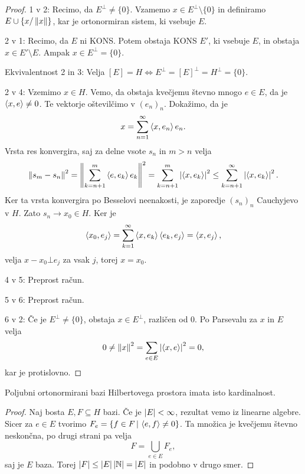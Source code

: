 \begin{proof}
  1 v 2:
  Recimo, da $E^\bot \ne \{0\}$.
  Vzamemo $x \in E^\bot \setminus \{0\}$ in definiramo $E \cup \{x /
  \left\lVert x\right\rVert\}$, kar je ortonormiran sistem, ki vsebuje $E$.
  \protislovje{}

  2 v 1:
  Recimo, da $E$ ni KONS\@.
  Potem obstaja KONS $E'$, ki vsebuje $E$, in obstaja $x \in E' \setminus E$.
  Ampak $x \in E^\bot = \{0\}$.
  \protislovje{}

  Ekvivalentnost 2 in 3:
  Velja $[E] = H \iff E^\bot = [E]^\bot = H^\bot = \{0\}$.

  2 v 4:
  Vzemimo $x \in H$.
  Vemo, da obstaja kvečjemu števno mnogo $e \in E$, da je $\left< x,e \right> \ne 0$.
  Te vektorje oštevilčimo v $(e_n)_n$.
  Dokažimo, da je
  \[
	x = \sum_{n=1}^\infty \left< x, e_n \right> e_n.
  \]
  Vrsta res konvergira, saj za delne vsote $s_n$ in $m > n$ velja
  \[
	\left\lVert s_m - s_n\right\rVert^2 = \left\lVert\sum_{k=n+1}^m \left< e, e_k \right> e_k\right\rVert^2
	= \sum_{k=n+1}^m \left| \left< x, e_k \right> \right|^2
	\le \sum_{k=n+1}^\infty \left| \left< x, e_k \right> \right|^2.
  \]
  Ker ta vrsta konvergira po Besselovi neenakosti, je zaporedje $(s_n)_n$
  Cauchyjevo v $H$.
  Zato $s_n \to x_0 \in H$.
  Ker je
  \[
	\left< x_0, e_j \right> = \sum_{k=1}^\infty \left< x, e_k \right> \left< e_k, e_j \right> = \left< x, e_j \right>,
  \]
  velja $x - x_0 \bot e_j$ za vsak $j$, torej $x = x_0$.

  4 v 5:
  Preprost račun.

  5 v 6:
  Preprost račun.

  6 v 2:
  Če je $E^\bot \ne \{0\}$, obstaja $x \in E^\bot$, različen od $0$.
  Po Parsevalu za $x$ in $E$ velja
  \[
	0 \ne \left\lVert x\right\rVert^2 = \sum_{e \in E} \left| \left< x, e \right> \right|^2 = 0,
  \]
  kar je protislovno.
  \protislovje{}
\end{proof}


\begin{trditev}
  Poljubni ortonormirani bazi Hilbertovega prostora imata isto kardinalnost.
\end{trditev}

\begin{proof}
  Naj bosta $E, F \subseteq H$ bazi.
  Če je $\left| E \right| < \infty$, rezultat vemo iz linearne algebre.
  Sicer za $e \in E$ tvorimo $F_e = \{f \in F \,|\, \left< e,f \right> \ne 0\}$.
  Ta množica je kvečjemu števno neskončna, po drugi strani pa velja
  \[
	F = \bigcup_{e \in E} F_e,
  \]
  saj je $E$ baza.
  Torej $\left| F \right| \le \left| E \right| \left| \mathbb{N} \right| = \left| E \right|$ in podobno v drugo smer.
\end{proof}

